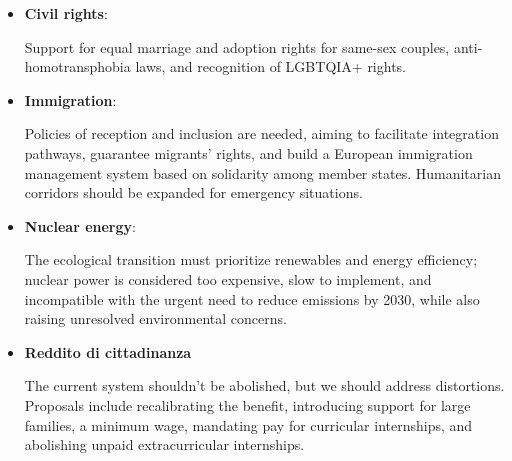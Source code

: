 \begin{itemize}
    \item \textbf{Civil rights}:
        \begin{tcolorbox} Support for equal marriage and adoption rights for same-sex couples, anti-homotransphobia laws, and recognition of LGBTQIA+ rights. 
        \end{tcolorbox}

    \item \textbf{Immigration}:
        \begin{tcolorbox}[prompt]
            [SUPPORTIVE] Policies of reception and inclusion are needed, aiming to facilitate integration pathways, guarantee migrants' rights, and build a European immigration management system based on solidarity among member states. Humanitarian corridors should be expanded for emergency situations.
        \end{tcolorbox}
        
    \item \textbf{Nuclear energy}: 
        \begin{tcolorbox} The ecological transition must prioritize renewables and energy efficiency; nuclear power is considered too expensive, slow to implement, and incompatible with the urgent need to reduce emissions by 2030, while also raising unresolved environmental concerns.
        \end{tcolorbox}
    
    \item \textbf{Reddito di cittadinanza}
        \begin{tcolorbox}[prompt]
            [SUPPORTIVE] The current system shouldn't be abolished, but we should address distortions. Proposals include recalibrating the benefit, introducing support for large families, a minimum wage, mandating pay for curricular internships, and abolishing unpaid extracurricular internships.
        \end{tcolorbox}
\end{itemize}